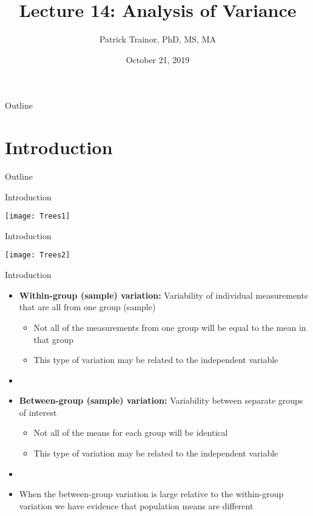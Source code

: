 \documentclass[xcolor=dvipsnames]{beamer}
\title[Lecture 14]{Lecture 14: Analysis of Variance}
\author[Patrick Trainor]{Patrick Trainor, PhD, MS, MA}
\institute[NMSU]{New Mexico State University}
\date{October 21, 2019}
\begin{document}
	
\begin{frame}
	\maketitle
\end{frame}

\begin{frame}{Outline}
	\tableofcontents[hideallsubsections]
\end{frame}

\section{Introduction}

\begin{frame}{Outline}
	\tableofcontents[currentsection,subsectionstyle=show/shaded/hide]
\end{frame}

\begin{frame}{Introduction}
	\begin{center}
		\texttt{[image: Trees1]}
	\end{center}
\end{frame}

\begin{frame}{Introduction}
	\begin{center}
		\texttt{[image: Trees2]}
	\end{center}
\end{frame}

\begin{frame}{Introduction}
	\begin{itemize}
		\item \textbf{Within-group (sample) variation:} Variability of individual measurements that are all from one group (sample) \pause
		\begin{itemize}
			\item Not all of the measurements from one group will be equal to the mean in that group \pause
			\item This type of variation may be related to the independent variable \pause
		\end{itemize}
		\item[]
		\item \textbf{Between-group (sample) variation:} Variability between separate groups of interest \pause
		\begin{itemize}
			\item Not all of the means for each group will be identical \pause
			\item This type of variation may be related to the independent variable \pause
		\end{itemize}
		\item[]
		\item When the between-group variation is large relative to the within-group variation we have evidence that population means are different 
	\end{itemize}
\end{frame}
\end{document}
